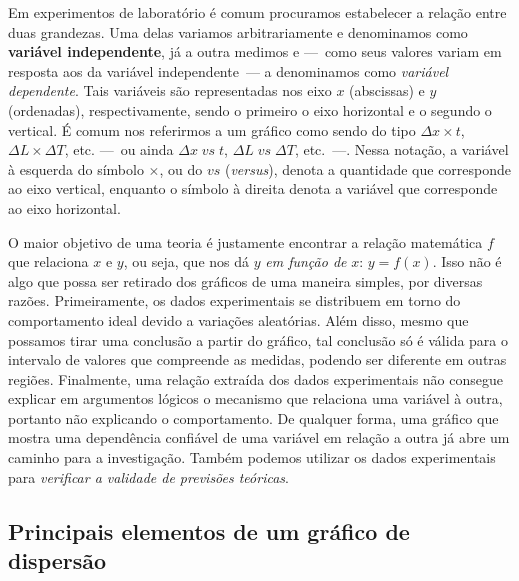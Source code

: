 Em experimentos de laboratório é comum procuramos estabelecer a relação entre duas grandezas. Uma delas variamos arbitrariamente e denominamos como \textbf{variável independente}, já a outra medimos e ---~como seus valores variam em resposta aos da variável independente~--- a denominamos como \emph{variável dependente}. Tais variáveis são representadas nos eixo $x$  (abscissas) e $y$ (ordenadas), respectivamente, sendo o primeiro o eixo horizontal e o segundo o vertical. É comum nos referirmos a um gráfico como sendo do tipo $\Delta x \times t$, $\Delta L \times \Delta T$, etc. ---~ou ainda $\Delta x \;vs\; t$, $\Delta L \;vs\; \Delta T$, etc.~---. Nessa notação, a variável à esquerda do símbolo $\times$, ou do $vs$ (\emph{versus}), denota a quantidade que corresponde ao eixo vertical, enquanto o símbolo à direita denota a variável que corresponde ao eixo horizontal.

O maior objetivo de uma teoria é justamente encontrar a relação matemática $f$ que relaciona $x$ e $y$, ou seja, que nos dá $y$ \emph{em função de} $x$: $y = f(x)$. Isso não é algo que possa ser retirado dos gráficos de uma maneira simples, por diversas razões. Primeiramente, os dados experimentais se distribuem em torno do comportamento ideal devido a variações aleatórias. Além disso, mesmo que possamos tirar uma conclusão a partir do gráfico, tal conclusão só é válida para o intervalo de valores que compreende as medidas, podendo ser diferente em outras regiões. Finalmente, uma relação extraída dos dados experimentais não consegue explicar em argumentos lógicos o mecanismo que relaciona uma variável à outra, portanto não explicando o comportamento. De qualquer forma, uma gráfico que mostra uma dependência confiável de uma variável em relação a outra já abre um caminho para a investigação. Também podemos utilizar os dados experimentais para \emph{verificar a validade de previsões teóricas}.

\pagebreak
\subsection{Principais elementos de um gráfico de dispersão}

